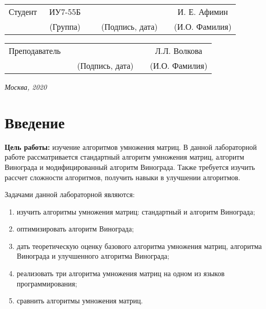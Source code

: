 \documentclass[utf8x, 12pt]{G7-32}
\begin{document}
\vspace{1.5cm}
\noindent
\begin{tabular}{l c c c c c}
    Студент      & ~ИУ7-55Б~               & \hspace{3.5cm} & \hspace{3.5cm}                 & &  И. Е. Афимин \\\cline{2-2}\cline{4-4} \cline{6-6} 
    \hspace{3cm} & {\footnotesize(Группа)} &                & {\footnotesize(Подпись, дата)} & & {\footnotesize(И.О. Фамилия)}
\end{tabular}

\vspace{1cm}

\noindent
\begin{tabular}{l c c c c}
    Преподаватель & \hspace{6cm}   & \hspace{3.5cm}                 & & Л.Л. Волкова \\\cline{3-3} \cline{5-5} 
    \hspace{3cm}  &                & {\footnotesize(Подпись, дата)} & & {\footnotesize(И.О. Фамилия)}
\end{tabular}

\begin{center}	
	\vfill
	\large \textit {Москва, 2020}
\end{center}

\thispagestyle {empty}
\pagebreak

\tableofcontents

\newpage
\chapter*{Введение}
\textbf{Цель работы:} изучение алгоритмов умножения матриц. В данной лабораторной работе рассматривается стандартный алгоритм умножения матриц, алгоритм Винограда и модифицированный алгоритм Винограда.  Также требуется изучить рассчет сложности алгоритмов, получить навыки в улучшении алгоритмов.

Задачами данной лабораторной являются:
\begin{enumerate}
  	\item изучить алгоритмы умножения матриц: стандартный и алгоритм Винограда; 
	\item оптимизировать алгоритм Винограда;
	\item дать теоретическую оценку базового алгоритма умножения матриц, алгоритма Винограда и улучшенного алгоритма Винограда;
	\item реализовать три алгоритма умножения матриц на одном из языков программирования;
	\item сравнить алгоритмы умножения матриц.
\end{enumerate}
\end{document}
